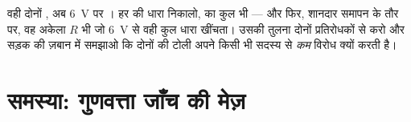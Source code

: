 \begin{exercise}[$\star\star\star$]\label{exo:g8:ohms-law:12}
वही दोनों , अब \qty{6}{V} पर । हर  की धारा
निकालो,  का कुल भी --- और फिर, शानदार समापन के तौर पर, वह अकेला
 $R$ भी जो \qty{6}{V} से वही कुल धारा खींचता। उसकी तुलना
दोनों प्रतिरोधकों से करो और सड़क की ज़बान में समझाओ कि दोनों की टोली
अपने किसी भी सदस्य से \emph{कम} विरोध क्यों करती है।
\end{exercise}

\section{समस्या: गुणवत्ता जाँच की मेज़}

